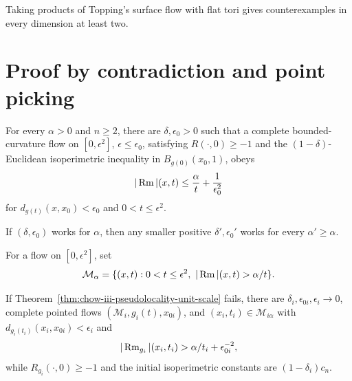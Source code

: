 \begin{remark}
\label{rem:chow-iii-topping-products}
Taking products of Topping's surface flow with flat tori gives counterexamples
in every dimension at least two.
\end{remark}

\section{Proof by contradiction and point picking}

\begin{theorem}[\(r_0=1\) case of pseudolocality]
\label{thm:chow-iii-pseudolocality-unit-scale}
For every \(\alpha>0\) and \(n\ge2\), there are \(\delta,\epsilon_0>0\) such
that a complete bounded-curvature flow on \([0,\epsilon^2]\), \(\epsilon\le
\epsilon_0\), satisfying \(R(\cdot,0)\ge-1\) and the \((1-\delta)\)-Euclidean
isoperimetric inequality in \(B_{g(0)}(x_0,1)\), obeys
\[
|\operatorname{Rm}|(x,t)\le\frac\alpha t+\frac1{\epsilon_0^2}
\]
for \(d_{g(t)}(x,x_0)<\epsilon_0\) and \(0<t\le\epsilon^2\).
\end{theorem}

\begin{remark}
\label{rem:chow-iii-pseudolocality-parameter-monotonicity}
If \((\delta,\epsilon_0)\) works for \(\alpha\), then any smaller positive
\(\delta',\epsilon_0'\) works for every \(\alpha'\ge\alpha\).
\end{remark}

\begin{definition}
\label{def:chow-iii-alpha-large-curvature}
For a flow on \([0,\epsilon^2]\), set
\[
\mathcal M_\alpha=\{(x,t):0<t\le\epsilon^2,\ |\Rm|(x,t)>\alpha/t\}.
\]
\end{definition}

\begin{theorem}
\label{ctr:chow-iii-pseudolocality-counterstatement}
If Theorem~\ref{thm:chow-iii-pseudolocality-unit-scale} fails, there are
\(\delta_i,\epsilon_{0i},\epsilon_i\to0\), complete pointed flows
\((\mathcal M_i,g_i(t),x_{0i})\), and \((x_i,t_i)\in\mathcal M_{i\alpha}\) with
\(d_{g_i(t_i)}(x_i,x_{0i})<\epsilon_i\) and
\[
|\operatorname{Rm}_{g_i}|(x_i,t_i)>\alpha/t_i+\epsilon_{0i}^{-2},
\]
while \(R_{g_i}(\cdot,0)\ge-1\) and the initial isoperimetric constants are
\((1-\delta_i)c_n\).
\end{theorem}

